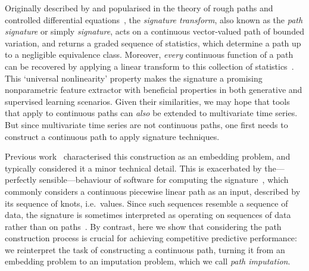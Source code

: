 \documentclass{article}
\begin{document}
Originally described by \citet{Chen54, Chen57, Chen58} and popularised
in the theory of rough paths and controlled differential
equations~\cite{lyons1998differential, FritzVictoir10, lyons2014rough},
the \emph{signature transform}, also known as the \emph{path signature}
or simply \emph{signature}, acts on a continuous vector-valued path of
bounded variation, and returns a graded sequence of statistics, which
determine a path up to a negligible equivalence class. Moreover,
\emph{every} continuous function of a path can be recovered by applying
a linear transform to this collection of statistics~\citep[Proposition
A.6]{kidger2019deep}.
%
This `universal nonlinearity' property makes the signature a promising nonparametric
feature extractor with beneficial properties in both generative and
supervised learning scenarios.
%
Given their similarities, we may hope that tools that
apply to continuous paths can \emph{also} be extended to multivariate
time series. But since multivariate time series are not continuous
paths, one first needs to construct a continuous path to apply signature techniques.

Previous work~\citep{levin2013, kidger2019deep, fermanian2019embedding}
characterised this construction as an embedding problem, and
typically considered it a minor technical detail.
This is exacerbated by the---perfectly sensible---behaviour of software
for computing the signature~\citep{iisignature, signatory}, which
commonly considers a continuous piecewise linear path as an input,
described by its sequence of knots, i.e.\ values.
%
Since such sequences resemble a sequence of data, the signature is
sometimes interpreted as operating on sequences of data rather than on
paths~\cite{kidger2019deep, levin2013}.
%
By contrast, here we show that considering the path construction
process is crucial for achieving competitive predictive
performance: we reinterpret the task of constructing a continuous path,
turning it from an embedding problem to an imputation problem, which we
call \emph{path imputation}.
%
\end{document}
